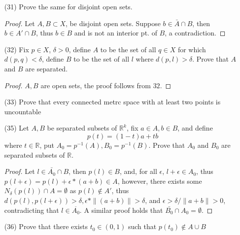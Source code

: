 \documentclass{amsart}
\numberwithin{equation}{section}
\theoremstyle{plain}
\theoremstyle{definition}
\begin{document}
\begin{enumerate}
\begin{proof}
  \end{proof}
  \item[(31)] Prove the same for disjoint open sets.
  \begin{proof}
    Let $A, B \subset X$, be disjoint open sets. Suppose $b \in \bar{A} \cap B$, then $b \in A' \cap B$, thus $b \in B$ and is not an interior pt. of $B$, a contradiction.
  \end{proof}
  \item[(32)]  Fix $p \in X$, $\delta > 0$, define $A$ to be the set of all $q \in X$ for which $d(p,q) < \delta$, define $B$ to be the set of all $l$ where $d(p,l) > \delta$. Prove that $A$ and $B$ are separated.
  \begin{proof}
    $A, B$ are open sets, the proof follows from $32$.
  \end{proof}
  \item[(33)] Prove that every connected metrc space with at least two points is uncountable\\
  \item[(35)] Let $A, B$ be separated subsets of $\mathbb{R}^k$, fix $a \in A, b \in B$, and define
  \begin{equation}
    p(t) = (1 -t)a + tb
  \end{equation}
  where $t \in \mathbb{R}$, put $A_0 = p^{-1}(A), B_0 = p^{-1}(B)$. Prove that $A_0$ and $B_0$ are separated subsets of $\mathbb{R}$. 
  \begin{proof}
    Let $l \in \bar{A_0} \cap B$, then $p(l) \in B$, and, for all $\epsilon$, $l + \epsilon \in A_0$, thus $p(l + \epsilon) = p(l) + \epsilon * (a + b) \in A$, however, there exists some $N_{\delta}(p(l)) \cap A = \emptyset$ as $p(l) \not \in A'$, thus $d(p(l), p(l + \epsilon)) > \delta,  \epsilon * \|(a + b) \| > \delta$, 
    and $\epsilon > \delta / \|a + b\| > 0$, contradicting that $l \in \overline{A_0}$. A similar proof holds that $\bar{B_0} \cap A_0 = \emptyset$.
  \end{proof}
  \item[(36)] Prove that there exists $t_0 \in (0,1)$ such that $p(t_0) \not \in A \cup B$
\end{enumerate}
\end{document}
